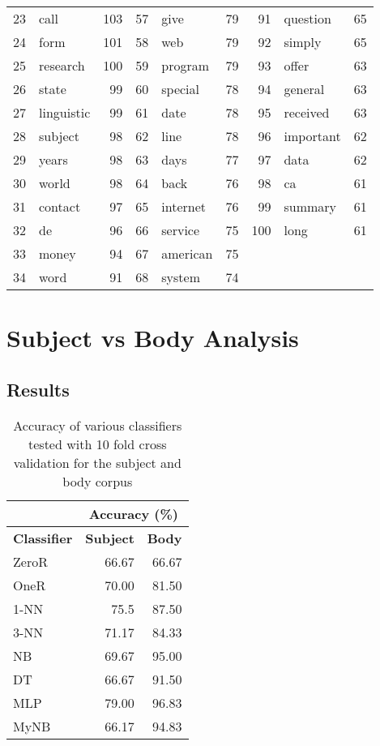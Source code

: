 \documentclass[10pt, a4paper]{article}
\begin{document}
\begin{table}[H]
\begin{tabular}{@{}rlrrlrrlr@{}}
23 & call & 103 & 57 & give & 79 & 91 & question & 65 \\
24 & form & 101 & 58 & web & 79 & 92 & simply & 65 \\
25 & research & 100 & 59 & program & 79 & 93 & offer & 63 \\
26 & state & 99 & 60 & special & 78 & 94 & general & 63 \\
27 & linguistic & 99 & 61 & date & 78 & 95 & received & 63 \\
28 & subject & 98 & 62 & line & 78 & 96 & important & 62 \\
29 & years & 98 & 63 & days & 77 & 97 & data & 62 \\
30 & world & 98 & 64 & back & 76 & 98 & ca & 61 \\
31 & contact & 97 & 65 & internet & 76 & 99 & summary & 61 \\
32 & de & 96 & 66 & service & 75 & 100 & long & 61 \\
33 & money & 94 & 67 & american & 75 & & & \\
34 & word & 91 & 68 & system & 74 & & & \\
\bottomrule
\end{tabular}
\label{table:bodycorpus}
\end{table}

\section{Subject vs Body Analysis}

\subsection{Results}


\begin{table}[H]
\centering
\caption{Accuracy of various classifiers tested with 10 fold cross validation for the subject and body corpus}\vspace{1em}
\begin{tabular}{@{}lrr@{}}
\toprule
& \multicolumn{2}{c}{\textbf{Accuracy (\%)}} \\
\midrule
\textbf{Classifier} & \textbf{Subject} & \textbf{Body} \\
\midrule
ZeroR & 66.67 & 66.67 \\
OneR & 70.00 & 81.50 \\
1-NN & 75.5 & 87.50 \\
3-NN & 71.17 & 84.33 \\
NB & 69.67 & 95.00 \\
DT & 66.67 & 91.50 \\
MLP & 79.00 & 96.83 \\
MyNB & 66.17 & 94.83 \\
\bottomrule
\end{tabular}
\label{table:results}
\end{table}
\end{document}
